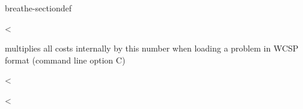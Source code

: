 \documentclass[letterpaper,10pt,openany,oneside,english]{sphinxmanual}
\begin{document}
\begin{fulllineitems}
\begin{sphinxuseclass}{breathe-sectiondef}
\begin{fulllineitems}
\label{\detokenize{ref/ref_cpp:_CPPv4N8ToulBar212decimalPointE}}\label{\detokenize{ref/ref_cpp:_CPPv3N8ToulBar212decimalPointE}}\label{\detokenize{ref/ref_cpp:_CPPv2N8ToulBar212decimalPointE}}\label{\detokenize{ref/ref_cpp:ToulBar2::decimalPoint__unsigned-i}}
\pysigstartsignatures
\pysigstartmultiline
{}
\pysigstopmultiline
\pysigstopsignatures
\sphinxAtStartPar
\textless{} 

\sphinxAtStartPar
multiplies all costs internally by this number when loading a problem in WCSP format (command line option \sphinxhyphen{}C) 

\end{fulllineitems}


\begin{fulllineitems}
\label{\detokenize{ref/ref_cpp:_CPPv4N8ToulBar28deltaUbSE}}\label{\detokenize{ref/ref_cpp:_CPPv3N8ToulBar28deltaUbSE}}\label{\detokenize{ref/ref_cpp:_CPPv2N8ToulBar28deltaUbSE}}\label{\detokenize{ref/ref_cpp:ToulBar2::deltaUbS__string}}
\pysigstartsignatures
\pysigstartmultiline
{}
\pysigstopmultiline
\pysigstopsignatures
\sphinxAtStartPar
\textless{} 

\end{fulllineitems}


\begin{fulllineitems}
\label{\detokenize{ref/ref_cpp:_CPPv4N8ToulBar27deltaUbE}}\label{\detokenize{ref/ref_cpp:_CPPv3N8ToulBar27deltaUbE}}\label{\detokenize{ref/ref_cpp:_CPPv2N8ToulBar27deltaUbE}}\label{\detokenize{ref/ref_cpp:ToulBar2::deltaUb__Cost}}
\pysigstartsignatures
\pysigstartmultiline
{}
\pysigstopmultiline
\pysigstopsignatures
\sphinxAtStartPar
\textless{} 


\end{fulllineitems}
\end{sphinxuseclass}
\end{fulllineitems}
\end{document}
